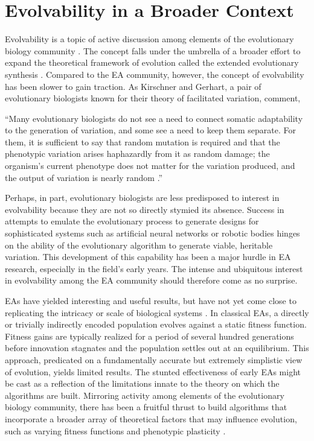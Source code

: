 \section{Evolvability in a Broader Context} \label{sec:conclusion}

Evolvability is a topic of active discussion among elements of the evolutionary biology community  \cite{Pigliucci2008IsEvolvable}. The concept falls under the umbrella of a broader effort to expand the theoretical framework of evolution called the extended evolutionary synthesis \cite{Pigliucci2007DoSynthesis}. Compared to the EA community, however, the concept of evolvability has been slower to gain traction. As Kirschner and Gerhart, a pair of evolutionary biologists known for their theory of facilitated variation, comment,
\begin{displayquote}
``Many evolutionary biologists do not see a need to connect somatic adaptability to the generation of variation, and some see a need to keep them separate. For them, it is sufficient to say that random mutation is required and that the phenotypic variation arises haphazardly from it as random damage; the organism's current phenotype does not matter for the variation produced, and the output of variation is nearly random \cite[p 219]{Kirschner2005TheDilemma}.''
\end{displayquote}
Perhaps, in part, evolutionary biologists are less predisposed to interest in evolvability because they are not so directly stymied its absence. Success in attempts to emulate the evolutionary process to generate designs for sophisticated systems such as artificial neural networks or robotic bodies hinges on the ability of the evolutionary algorithm to generate viable, heritable variation. This development of this capability has been a major hurdle in EA research, especially in the field's early years. The intense and ubiquitous interest in evolvability among the EA community should therefore come as no surprise.

EAs have yielded interesting and useful results, but have not yet come close to replicating the intricacy or scale of biological systems \cite{Tonelli2011OnSystems}. In classical EAs, a directly or trivially indirectly encoded population evolves against a static fitness function. Fitness gains are typically realized for a period of several hundred generations before innovation stagnates and the population settles out at an equilibrium. This approach, predicated on a fundamentally accurate but extremely simplistic view of evolution, yields limited results. The stunted effectiveness of early EAs might be cast as a reflection of the limitations innate to the theory on which the algorithms are built. Mirroring activity among elements of the evolutionary biology community, there has been a fruitful thrust to build algorithms that incorporate a broader array of theoretical factors that may influence evolution, such as varying fitness functions and phenotypic plasticity \cite{Kashtan2007VaryingEvolution,Moczek2011TheInnovation,Downing2012HeterochronousBaldwinism}.

